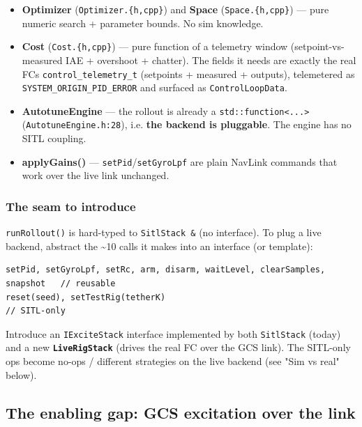 \documentclass[
  11pt,
]{article}
\providecommand{\tightlist}{%
  \setlength{\itemsep}{0pt}\setlength{\parskip}{0pt}}
\begin{document}
\begin{itemize}
\tightlist
\item
  \textbf{Optimizer} (\texttt{Optimizer.\{h,cpp\}}) and \textbf{Space}
  (\texttt{Space.\{h,cpp\}}) --- pure numeric search + parameter bounds.
  No sim knowledge.
\item
  \textbf{Cost} (\texttt{Cost.\{h,cpp\}}) --- pure function of a
  telemetry window (setpoint-vs-measured IAE + overshoot + chatter). The
  fields it needs are exactly the real FC\textquotesingle s
  \texttt{control\_telemetry\_t} (setpoints + measured + outputs),
  telemetered as \texttt{SYSTEM\_ORIGIN\_PID\_ERROR} and surfaced as
  \texttt{ControlLoopData}.
\item
  \textbf{AutotuneEngine} --- the rollout is already a
  \texttt{std::function\textless{}...\textgreater{}}
  (\texttt{AutotuneEngine.h:28}), i.e. \textbf{the backend is
  pluggable}. The engine has no SITL coupling.
\item
  \textbf{applyGains()} --- \texttt{setPid}/\texttt{setGyroLpf} are
  plain NavLink commands that work over the live link unchanged.
\end{itemize}

\hypertarget{the-seam-to-introduce}{%
\subsubsection{The seam to introduce}\label{the-seam-to-introduce}}

\texttt{runRollout()} is hard-typed to \texttt{SitlStack\ \&} (no
interface). To plug a live backend, abstract the \textasciitilde10 calls
it makes into an interface (or template):

\begin{verbatim}
setPid, setGyroLpf, setRc, arm, disarm, waitLevel, clearSamples, snapshot   // reusable
reset(seed), setTestRig(tetherK)                                            // SITL-only
\end{verbatim}

Introduce an \texttt{IExciteStack} interface implemented by both
\texttt{SitlStack} (today) and a new \textbf{\texttt{LiveRigStack}}
(drives the real FC over the GCS link). The SITL-only ops become no-ops
/ different strategies on the live backend (see "Sim vs real" below).

\hypertarget{the-enabling-gap-gcs-excitation-over-the-link}{%
\subsection{The enabling gap: GCS excitation over the
link}\label{the-enabling-gap-gcs-excitation-over-the-link}}
\end{document}
